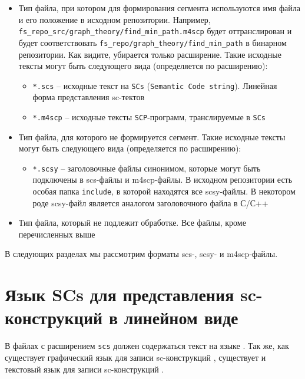 \begin{itemize}
\item Тип файла, при котором для формирования сегмента используются
  имя файла и его положение в исходном репозитории. Например,
  \verb|fs_repo_src/graph_theory/find_min_path.m4scp| будет
  оттранслирован и будет соответствовать
  \verb|fs_repo/graph_theory/find_min_path| в бинарном
  репозитории. Как видите, убирается только расширение. Такие исходные
  тексты могут быть следующего вида (определяется по расширению):

  \begin{itemize}
  \item \texttt{*.scs} – исходные текст на \texttt{SCs}
    (\texttt{Semantic Code string}). Линейная форма представления
    sc-тектов
  \item \texttt{*.m4scp} – исходные тексты \texttt{SCP}-программ,
    транслируемые в \texttt{SCs}
  \end{itemize}

\item Тип файла, для которого не формируется сегмент. Такие исходные
  тексты могут быть следующего вида (определяется по расширению):

  \begin{itemize}
  \item \texttt{*.scsy} – заголовочные файлы синонимом, которые могут
    быть подключены в scs-файлы и m4scp-файлы. В исходном репозитории
    есть особая папка \verb|include|, в которой находятся все
    scsy-файлы. В некотором роде scsy-файл является аналогом
    заголовочного файла в С/С++
  \end{itemize}

\item Тип файла, который не подлежит обработке. Все файлы, кроме
  перечисленных выше
\end{itemize}

В следующих разделах мы рассмотрим форматы scs-, scsy- и m4scp-файлы.

\section{Язык SCs для представления sc-конструкций в линейном виде}
\label{sec:scpalgo_scs}

В файлах с расширением \texttt{scs} должен содержаться текст на языке
\SCs. Так же, как существует графический язык для записи
sc-конструкций \SCg, существует и текстовый язык для записи
sc-конструкций \SCs.

